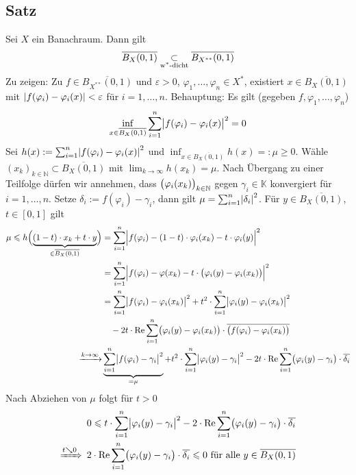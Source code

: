 \subsection[Satz: Einheitskugel eines Banachraumes $X$ liegt $\w^*$-dicht in Einheitskugel von $X^{**}$]{Satz} %
\label{sub:516}
Sei $X$ ein Banachraum. Dann gilt 
\[
	\overline{B_X(0,1)} \underset{\text{$\w^*$-dicht}}{\subset} \overline{B_{X^{**}}(0,1)}  
\]
Zu zeigen: Zu $f \in \overline{B_{X^{**}}(0,1)}$ und $\varepsilon>0$, $\varphi_1, \ldots , \varphi_n \in X^*$, existiert $x \in \overline{B_X(0,1)}$ mit
$\abs*{f(\varphi_i)- \varphi_i(x)} < \varepsilon$ für $i=1,\ldots ,n$. Behauptung: Es gilt (gegeben $f,\varphi_1, \ldots , \varphi_n$)
\[
	\inf_{x \in \overline{B_X(0,1)} } \sum_{i=1}^{n} \abs[\big]{f(\varphi_i)- \varphi_i(x)}^2 = 0
\]
Sei $h(x) := \sum_{i=1}^{n} \abs*{f(\varphi_i)- \varphi_i(x)}^2 $ und $\inf_{x\in \overline{B_X(0,1)}} h(x) =: \mu \ge 0$. Wähle 
$(x_k)_{k \in \mathds{N}} \subset \overline{B_X(0,1)}$ mit $\lim_{k \to \infty} h(x_k)= \mu$. Nach Übergang zu einer Teilfolge dürfen wir annehmen, dass 
$\enbrace[\big]{\varphi_i(x_k)}_{k \in \mathds{N}}$ gegen  $\gamma_i \in \mathds{K}$ konvergiert für $i=1,\ldots ,n$. Setze $\delta_i := f(\varphi_i) -\gamma_i$, dann
gilt $\mu = \sum_{i=1}^{n} \abs*{\delta_i}^2$. Für $y \in \overline{B_X(0,1)}$, $t \in [0,1]$ gilt 
\begin{align*}
	\mu \le h\enbrace[\Big]{\underbrace{(1-t) \cdot x_k + t \cdot y}_{\in \overline{B_X(0,1)}}} &= 
	\sum_{i=1}^{n} \abs[\Big]{f(\varphi_i)- (1-t) \cdot \varphi_i(x_k) - t \cdot \varphi_i(y)}^2 \\
	&= \sum_{i=1}^{n} \abs[\Big]{f(\varphi_i)- \varphi(x_k) - t \cdot  \enbrace[\big]{\varphi_i(y)- \varphi_i(x_k)} }^2 \\
	&= \sum_{i=1}^{n} \abs[\big]{f(\varphi_i)- \varphi_i(x_k)}^2 + t^2 \cdot \sum_{i=1}^{n} \abs[\big]{\varphi_i(y)- \varphi_i(x_k)}^2 \\
	& \quad - 2 t \cdot \re \sum_{i=1}^{n} \enbrace[\big]{\varphi_i(y)- \varphi_i(x_k)} \cdot \overline{\enbrace[\big]{f(\varphi_i)- \varphi_i(x_k)} } \\
	\xrightarrow{k \to \infty} &\underbrace{\sum_{i=1}^{n} \abs[\big]{f(\varphi_i)- \gamma_i}^2}_{=\mu} + t^2 \cdot \sum_{i=1}^{n} \abs[\big]{\varphi_i(y)- \gamma_i}^2  
	-2 t \cdot \re \sum_{i=1}^{n} \enbrace[\big]{\varphi_i(y)- \gamma_i} \cdot \overline{\delta_i }
\end{align*}
Nach Abziehen von $\mu$ folgt für $t >0$
\begin{align*}
	&0 \le t \cdot \sum_{i=1}^{n} \abs[\big]{\varphi_i(y)- \gamma_i}^2 - 2 \cdot \re \sum_{i=1}^{n} \enbrace[\big]{\varphi_i(y)- \gamma_i} \cdot \overline{\delta_i}  \\
	\xRightarrow{t \searrow 0} \enspace & 2 \cdot \re \sum_{i=1}^{n} \enbrace[\big]{\varphi_i(y)- \gamma_i} \cdot \overline{\delta_i} \le 0 \text{ für alle } y \in \overline{B_X(0,1) }
\end{align*}
